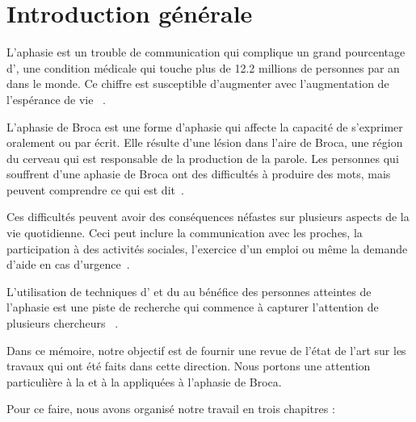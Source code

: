 \chapter*{Introduction générale}
\label{chap.intro}

L'aphasie est un trouble de communication qui complique un grand pourcentage d',
une condition médicale qui touche plus de 12.2 millions de personnes par an dans le monde.
Ce chiffre est susceptible d'augmenter avec l'augmentation de l'espérance de vie%
~\cite{Feigin_Brainin_Norrving_Martins_Sacco_Hacke_Fisher_Pandian_Lindsay_2022}.

L'aphasie de Broca est une forme d'aphasie qui affecte la capacité de s'exprimer oralement ou par écrit.
Elle résulte d'une lésion dans l'aire de Broca,
une région du cerveau qui est responsable de la production de la parole.
Les personnes qui souffrent d'une aphasie de Broca ont des difficultés à produire des mots,
mais peuvent comprendre ce qui est dit~\cite{Chapey_2008}.

Ces difficultés peuvent avoir des conséquences néfastes sur plusieurs aspects de la vie quotidienne.
Ceci peut inclure la communication avec les proches,
la participation à des activités sociales,
l'exercice d'un emploi
ou même la demande d'aide en cas d'urgence~\cite{Hallowell_2017}.

L'utilisation de techniques d' et du  
au bénéfice des personnes atteintes de l'aphasie est une piste de recherche  
qui commence à capturer l'attention de plusieurs chercheurs%
~\cite{Smaili_Langlois_Pribil_2022,Qin_Lee_Kong_Lin_2022,Misra_Mishra_Gandhi_2022}.

Dans ce mémoire, notre objectif est de fournir une revue de l'état de l'art
sur les travaux qui ont été faits dans cette direction.
Nous portons une attention particulière à la  et à la 
appliquées à l'aphasie de Broca.

Pour ce faire, nous avons organisé notre travail en trois chapitres :

